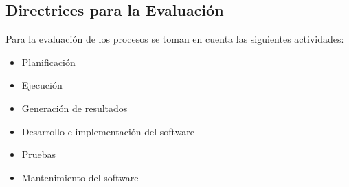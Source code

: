 \subsection{Directrices para la Evaluación}
Para la evaluación de los procesos se toman en cuenta las siguientes actividades: 
\begin{itemize}
	\item Planificación
	\item Ejecución
	\item Generación de resultados
	\item Desarrollo e implementación del software
	\item Pruebas
	\item Mantenimiento del software
\end{itemize}